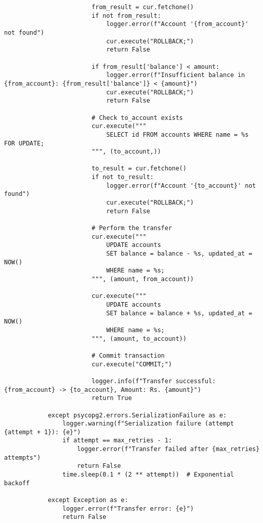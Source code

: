 \begin{verbatim}
                        from_result = cur.fetchone()
                        if not from_result:
                            logger.error(f"Account '{from_account}' not found")
                            cur.execute("ROLLBACK;")
                            return False

                        if from_result['balance'] < amount:
                            logger.error(f"Insufficient balance in {from_account}: {from_result['balance']} < {amount}")
                            cur.execute("ROLLBACK;")
                            return False

                        # Check to_account exists
                        cur.execute("""
                            SELECT id FROM accounts WHERE name = %s FOR UPDATE;
                        """, (to_account,))

                        to_result = cur.fetchone()
                        if not to_result:
                            logger.error(f"Account '{to_account}' not found")
                            cur.execute("ROLLBACK;")
                            return False

                        # Perform the transfer
                        cur.execute("""
                            UPDATE accounts
                            SET balance = balance - %s, updated_at = NOW()
                            WHERE name = %s;
                        """, (amount, from_account))

                        cur.execute("""
                            UPDATE accounts
                            SET balance = balance + %s, updated_at = NOW()
                            WHERE name = %s;
                        """, (amount, to_account))

                        # Commit transaction
                        cur.execute("COMMIT;")

                        logger.info(f"Transfer successful: {from_account} -> {to_account}, Amount: Rs. {amount}")
                        return True

            except psycopg2.errors.SerializationFailure as e:
                logger.warning(f"Serialization failure (attempt {attempt + 1}): {e}")
                if attempt == max_retries - 1:
                    logger.error(f"Transfer failed after {max_retries} attempts")
                    return False
                time.sleep(0.1 * (2 ** attempt))  # Exponential backoff

            except Exception as e:
                logger.error(f"Transfer error: {e}")
                return False


\end{verbatim}
